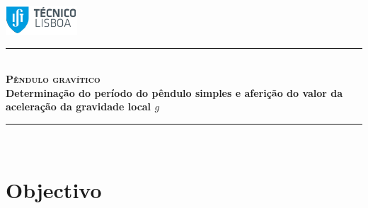\documentclass[a4paper,twoside,12pt]{article}      %
\author{Prof. Bernardo B. Carvalho}
\date{ Setembro 2014}
\newcommand{\HRule}{\rule{\linewidth}{0.5mm}}
\begin{document}
 

\includegraphics[width=0.2\textwidth]{../../logo-ist}%
	
	\HRule \\[0.5cm]
	{ \huge   \bfseries \textsc{ Pêndulo gravítico } }\\[0.4cm]
	{ \large \bfseries Determinação do período do pêndulo simples e aferição do valor da aceleração da gravidade local $g$  }\\
	\HRule \\%
	
%	 


\section{\sf Objectivo}
\end{document}
